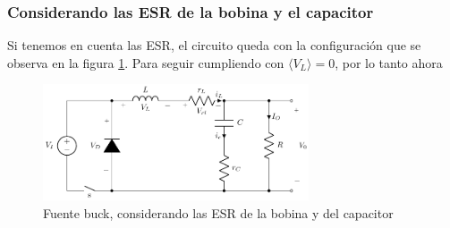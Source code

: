 \documentclass[e4_tp1_main.tex]{subfiles}
\begin{document}
\subsubsection{Considerando las ESR de la bobina y el capacitor}

Si tenemos en cuenta las ESR, el circuito queda con la configuraci\'on que se observa en la figura \ref{fig:buck-esrs}. Para seguir cumpliendo con $\langle V_L \rangle = 0$, por lo tanto ahora 

\begin{figure}[ht]
	\centering
	\includegraphics[width=0.7\textwidth]{images/ej2/buck_esrs.pdf}
	\caption{Fuente buck, considerando las ESR de la bobina y del capacitor}
	\label{fig:buck-esrs}
\end{figure}
\end{document}
